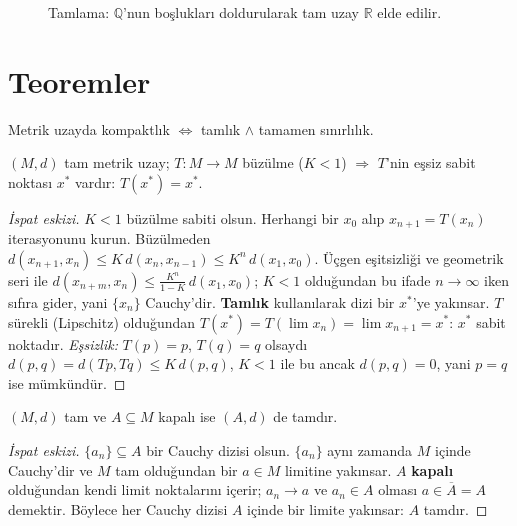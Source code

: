 \begin{figure}[ht]
\centering

\caption{Tamlama: $\mathbb{Q}$'nun boşlukları doldurularak tam uzay $\mathbb{R}$
elde edilir.}
\end{figure}

\section{Teoremler}

\begin{theorem}
Metrik uzayda kompaktlık $\Leftrightarrow$ tamlık $\wedge$ tamamen sınırlılık.
\end{theorem}

\begin{theorem}
$(M, d)$ tam metrik uzay; $T: M \to M$ büzülme ($K < 1$)
$\Rightarrow$ $T$'nin eşsiz sabit noktası $x^*$ vardır: $T(x^*) = x^*$.
\end{theorem}

\begin{proof}[İspat eskizi]
$K < 1$ büzülme sabiti olsun. Herhangi bir $x_0$ alıp $x_{n+1} = T(x_n)$
iterasyonunu kurun. Büzülmeden
$d(x_{n+1}, x_n) \leq K\, d(x_n, x_{n-1}) \leq K^n\, d(x_1, x_0)$. Üçgen
eşitsizliği ve geometrik seri ile
$d(x_{n+m}, x_n) \leq \tfrac{K^n}{1-K}\, d(x_1, x_0)$; $K < 1$ olduğundan bu
ifade $n \to \infty$ iken sıfıra gider, yani $\{x_n\}$ Cauchy'dir.
\textbf{Tamlık} kullanılarak dizi bir $x^*$'ye yakınsar. $T$ sürekli (Lipschitz)
olduğundan $T(x^*) = T(\lim x_n) = \lim x_{n+1} = x^*$: $x^*$ sabit noktadır.
\emph{Eşsizlik:} $T(p) = p$, $T(q) = q$ olsaydı
$d(p,q) = d(Tp, Tq) \leq K\, d(p,q)$, $K < 1$ ile bu ancak $d(p,q) = 0$, yani
$p = q$ ise mümkündür.
\end{proof}

\begin{theorem}
$(M, d)$ tam ve $A \subseteq M$ kapalı ise $(A, d)$ de tamdır.
\end{theorem}

\begin{proof}[İspat eskizi]
$\{a_n\} \subseteq A$ bir Cauchy dizisi olsun. $\{a_n\}$ aynı zamanda $M$ içinde
Cauchy'dir ve $M$ tam olduğundan bir $a \in M$ limitine yakınsar. $A$
\textbf{kapalı} olduğundan kendi limit noktalarını içerir; $a_n \to a$ ve
$a_n \in A$ olması $a \in \overline{A} = A$ demektir. Böylece her Cauchy dizisi
$A$ içinde bir limite yakınsar: $A$ tamdır.
\end{proof}

